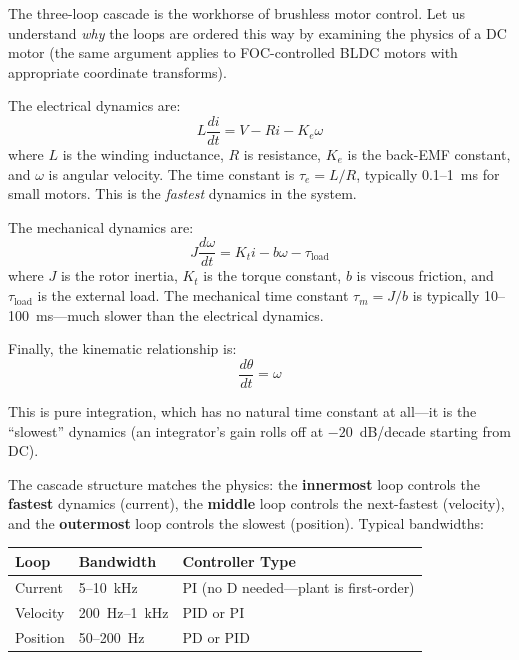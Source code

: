 The three-loop cascade is the workhorse of brushless motor control. Let us understand \textit{why} the loops are ordered this way by examining the physics of a DC motor (the same argument applies to FOC-controlled BLDC motors with appropriate coordinate transforms).

The electrical dynamics are:
\begin{equation}
L \frac{di}{dt} = V - Ri - K_e \omega
\end{equation}
where $L$ is the winding inductance, $R$ is resistance, $K_e$ is the back-EMF constant, and $\omega$ is angular velocity. The time constant is $\tau_e = L/R$, typically 0.1--1~ms for small motors. This is the \textit{fastest} dynamics in the system.

The mechanical dynamics are:
\begin{equation}
J \frac{d\omega}{dt} = K_t i - b\omega - \tau_{\text{load}}
\end{equation}
where $J$ is the rotor inertia, $K_t$ is the torque constant, $b$ is viscous friction, and $\tau_{\text{load}}$ is the external load. The mechanical time constant $\tau_m = J/b$ is typically 10--100~ms---much slower than the electrical dynamics.

Finally, the kinematic relationship is:
\begin{equation}
\frac{d\theta}{dt} = \omega
\end{equation}

This is pure integration, which has no natural time constant at all---it is the ``slowest'' dynamics (an integrator's gain rolls off at $-20$~dB/decade starting from DC).

The cascade structure matches the physics: the \textbf{innermost} loop controls the \textbf{fastest} dynamics (current), the \textbf{middle} loop controls the next-fastest (velocity), and the \textbf{outermost} loop controls the slowest (position). Typical bandwidths:

\begin{center}
\begin{tabular}{l l l}
\hline
\textbf{Loop} & \textbf{Bandwidth} & \textbf{Controller Type} \\
\hline
Current & 5--10~kHz & PI (no D needed---plant is first-order) \\
Velocity & 200~Hz--1~kHz & PID or PI \\
Position & 50--200~Hz & PD or PID \\
\hline
\end{tabular}
\end{center}

